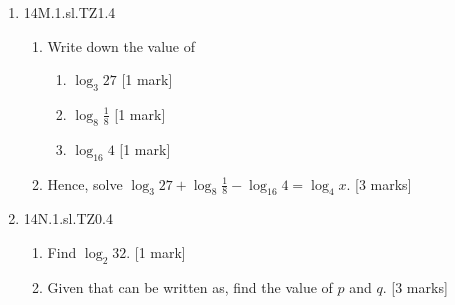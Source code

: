 \documentclass[12pt, twoside]{article}
\begin{document}
\begin{enumerate}
  \item 14M.1.sl.TZ1.4\\
  \begin{enumerate}
    \item Write down the value of
  \begin{enumerate}
    \item $\log_3 27$ [1 mark]
    \item $\log_8 \frac{1}{8}$ [1 mark]
    \item $\log_{16} 4$ [1 mark]
  \end{enumerate}
  \item Hence, solve $\log_3 27 + \log_8 \frac{1}{8} - \log_{16} 4 = \log_4 x$. [3 marks]
  \end{enumerate}


  \item 14N.1.sl.TZ0.4\\
  \begin{enumerate}
    \item Find $\log_2 32$. [1 mark]
    \item Given that can be written as, find the value of $p$ and $q$. [3 marks]
  \end{enumerate}

\end{enumerate}
\end{document}
